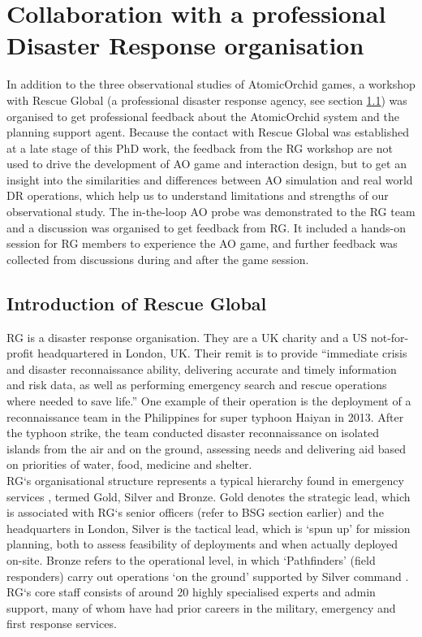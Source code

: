 \section{Collaboration with a professional Disaster Response organisation}
In addition to the three observational studies of AtomicOrchid games, a workshop with Rescue Global (a professional disaster response agency, see section \ref{sec:rg}) was organised to get professional feedback about the AtomicOrchid system and the planning support agent. Because the contact with Rescue Global was established at a late stage of this PhD work, the feedback from the \ac{RG} workshop are not used to drive the development of \ac{AO} game and interaction design, but to get an insight into the similarities and differences between \ac{AO} simulation and real world \ac{DR} operations, which help us to understand limitations and strengths of our observational study. The in-the-loop \ac{AO} probe was demonstrated to the \ac{RG} team and a discussion was organised to get feedback from \ac{RG}. It included a hands-on session for \ac{RG} members to experience the \ac{AO} game, and further feedback was collected from discussions during and after the game session.\\

\subsection{Introduction of Rescue Global}\label{sec:rg}
\acf{RG} is a disaster response organisation. They are a UK charity and a US not-for-profit headquartered in London, UK. Their remit is to provide ``immediate crisis and disaster reconnaissance ability, delivering accurate and timely information and risk data, as well as performing emergency search and rescue operations where needed to save life.'' One example of their operation is the deployment of a reconnaissance team in the Philippines for super typhoon Haiyan in 2013. After the typhoon strike, the team conducted disaster reconnaissance on isolated islands from the air and on the ground, assessing needs and delivering aid based on priorities of water, food, medicine and shelter.\\

\ac{RG}`s organisational structure represents a typical hierarchy found in emergency services \citep{U.S.DepartmentofHomelandSecurity2008}, termed Gold, Silver and Bronze. Gold denotes the strategic lead, which is associated with \ac{RG}`s senior officers (refer to BSG section earlier) and the headquarters in London, Silver is the tactical lead, which is `spun up' for mission planning, both to assess feasibility of deployments and when actually deployed on-site. Bronze refers to the operational level, in which `Pathfinders' (field responders) carry out operations `on the ground' supported by Silver command \citep{RescueGlobal2012}. \ac{RG}`s core staff consists of around 20 highly specialised experts and admin support, many of whom have had prior careers in the military, emergency and first response services.\\

